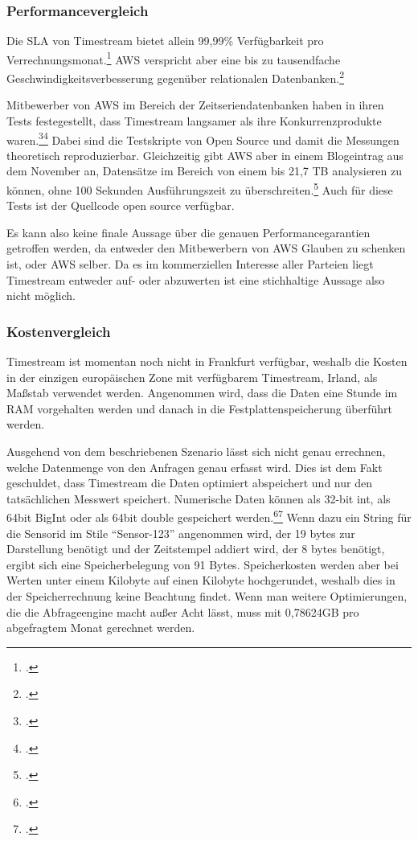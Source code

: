 \subsubsection{Performancevergleich}
Die \ac{SLA} von Timestream bietet allein 99,99\% Verfügbarkeit pro Verrechnungsmonat.\footcite[Vgl.][]{AmazonWebServicesInc..2020d} \ac{AWS} verspricht aber eine bis zu tausendfache Geschwindigkeitsverbesserung gegenüber relationalen Datenbanken.\footcite[Vgl.][]{AmazonWebServicesInc..o.J.ak}

Mitbewerber von \ac{AWS} im Bereich der Zeitseriendatenbanken haben in ihren Tests festegestellt, dass Timestream langsamer als ihre Konkurrenzprodukte waren.\footcite[Vgl.][]{Booz.2020}\nzitat\footcite[Vgl.][]{Crate.ioInc..2020} Dabei sind die Testskripte von \citeauthor{Booz.2020} Open Source und damit die Messungen theoretisch reproduzierbar. Gleichzeitig gibt \ac{AWS} aber in einem Blogeintrag aus dem November an, Datensätze im Bereich von einem bis 21,7 TB analysieren zu können, ohne 100 Sekunden Ausführungszeit zu überschreiten.\footcite[Vgl.][]{Das.2020} Auch für diese Tests ist der Quellcode open source verfügbar.

Es kann also keine finale Aussage über die genauen Performancegarantien getroffen werden, da entweder den Mitbewerbern von \ac{AWS} Glauben zu schenken ist, oder \ac{AWS} selber. Da es im kommerziellen Interesse aller Parteien liegt Timestream entweder auf- oder abzuwerten ist eine stichhaltige Aussage also nicht möglich.

\subsubsection{Kostenvergleich}


Timestream ist momentan noch nicht in Frankfurt verfügbar, weshalb die Kosten in der einzigen europäischen Zone mit verfügbarem Timestream, Irland, als Maßstab verwendet werden. Angenommen wird, dass die Daten eine Stunde im \ac{RAM} vorgehalten werden und danach in die Festplattenspeicherung überführt werden.


Ausgehend von dem beschriebenen Szenario lässt sich nicht genau errechnen, welche Datenmenge von den Anfragen genau erfasst wird. Dies ist dem Fakt geschuldet, dass Timestream die Daten optimiert abspeichert und nur den tatsächlichen Messwert speichert. Numerische Daten können als 32-bit int, als 64bit BigInt oder als 64bit double gespeichert werden.\footcite[Vgl. auch im Folgenden][]{AmazonWebServicesInc..o.J.r}\nzitat\footcite[Vgl. auch im Folgenden][]{AmazonWebServicesInc..o.J.q} Wenn dazu ein String für die Sensorid im Stile \enquote{Sensor-123} angenommen wird, der 19 bytes zur Darstellung benötigt und der Zeitstempel addiert wird, der 8 bytes benötigt, ergibt sich eine Speicherbelegung von 91 Bytes. Speicherkosten werden aber bei Werten unter einem Kilobyte auf einen Kilobyte hochgerundet, weshalb dies in der Speicherrechnung keine Beachtung findet. Wenn man weitere Optimierungen, die die Abfrageengine macht außer Acht lässt, muss mit 0,78624GB pro abgefragtem Monat gerechnet werden.


